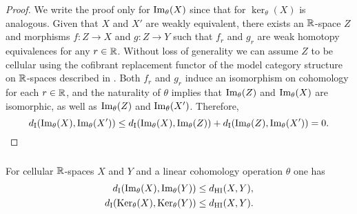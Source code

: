 \begin{proof}
	We write the proof only for $\operatorname{Im}_\theta(X)$ since that for $\ker_\theta(X)$ is analogous.
	Given that $X$ and $X'$ are weakly equivalent, there exists an $\mathbb{R}$-space $Z$ and morphisms $f \colon Z \to X$ and $g \colon Z \to Y$ such that $f_r$ and $g_r$ are weak homotopy equivalences for any $r \in \mathbb{R}$.
	Without loss of generality we can assume $Z$ to be cellular using the cofibrant replacement functor of the model category structure on $\mathbb{R}$-spaces described in \cite{blumberg2023interleaving}.
	Both $f_r$ and $g_r$ induce an isomorphism on cohomology for each $r \in \mathbb{R}$, and the naturality of $\theta$ implies that $\operatorname{Im}_\theta(Z)$ and $\operatorname{Im}_\theta(X)$ are isomorphic, as well as $\operatorname{Im}_\theta(Z)$ and $\operatorname{Im}_\theta(X')$.
	Therefore,
	\[
	d_{\mathrm{I}}(\operatorname{Im}_\theta(X),\operatorname{Im}_\theta(X')) \leq
	d_{\mathrm{I}}(\operatorname{Im}_\theta(X),\operatorname{Im}_\theta(Z)) + d_{\mathrm{I}}(\operatorname{Im}_\theta(Z),\operatorname{Im}_\theta(X')) =
	0.\qedhere
	\]
\end{proof}

\subsubsection{}\label{thm:theta stability}

\theorem
For cellular $\mathbb{R}$-spaces $X$ and $Y$ and a linear cohomology operation $\theta$ one has
\begin{align*}
	d_{\mathrm{I}}(\operatorname{Im}_\theta(X), \operatorname{Im}_\theta(Y)) &\leq d_{\mathrm{HI}}(X,Y), \\
	d_{\mathrm{I}}(\operatorname{Ker}_\theta(X), \operatorname{Ker}_\theta(Y)) &\leq d_{\mathrm{HI}}(X,Y).
\end{align*}

